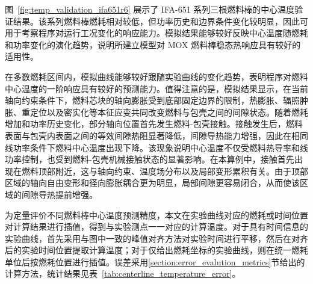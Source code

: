 图~\ref{fig:temp_validation_ifa651r6} 展示了 IFA-651 系列三根燃料棒的中心温度验证结果。该系列燃料棒燃耗相对较低，但功率历史和边界条件变化较明显，因此可用于考察程序对运行工况变化的响应能力。模拟结果能够较好反映中心温度随燃耗和功率变化的演化趋势，说明所建立模型对 MOX 燃料棒稳态热响应具有较好的适用性。

在多数燃耗区间内，模拟曲线能够较好跟随实验曲线的变化趋势，表明程序对燃料中心温度的一阶响应具有较好的预测能力。值得注意的是，模拟结果显示，在当前轴向约束条件下，燃料芯块的轴向膨胀受到底部固定边界的限制，热膨胀、辐照肿胀、重定位以及密实化等本征应变共同改变燃料与包壳之间的间隙状态。随着燃耗增加和功率历史变化，部分轴向位置首先发生燃料-包壳接触。接触发生后，燃料表面与包壳内表面之间的等效间隙热阻显著降低，间隙导热能力增强，因此在相同线功率条件下燃料中心温度出现下降。该现象说明中心温度不仅受燃料热导率和线功率控制，也受到燃料-包壳机械接触状态的显著影响。在本算例中，接触首先出现在燃料顶部附近，这与轴向约束、温度场分布以及局部变形累积有关。由于顶部区域的轴向自由变形和径向膨胀耦合更为明显，局部间隙更容易闭合，从而使该区域的间隙导热提前增强。

为定量评价不同燃料棒中心温度预测精度，本文在实验曲线对应的燃耗或时间位置对计算结果进行插值，得到与实验测点一一对应的计算温度。对于具有时间信息的实验曲线，首先采用与图中一致的峰值对齐方法对实验时间进行平移，然后在对齐后的实验时间位置提取计算温度；对于仅给出燃耗坐标的实验曲线，则在统一燃耗单位后按燃耗位置进行插值。误差采用\ref{section:error_evalution_metrics}节给出的计算方法，统计结果见表~\ref{tab:centerline_temperature_error}。

